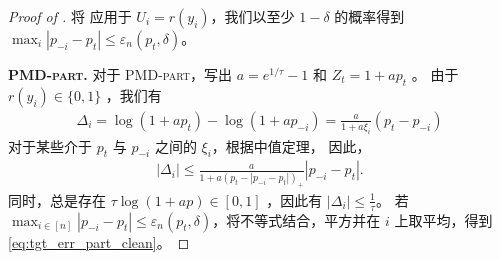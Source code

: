 \documentclass{article}
\theoremstyle{plain}
\theoremstyle{definition}
\theoremstyle{remark}
\newcommand{\abs}[1]{\left|#1\right|}
\begin{document}
\begin{proof}[Proof of ]
    将  应用于 $U_i=r(y_i)$，我们以至少 $1-\delta$ 的概率得到 $\max_i\abs{p_{-i}-p_t}\leq \varepsilon_n(p_t,\delta)$。

    \noindent\textbf{\textsc{PMD-part}.} 
    对于 \textsc{PMD-part}，写出 $a=e^{1/\tau}-1$  和 $Z_t=1+a p_t$ 。
    由于 $r(y_i)\in\{0,1\}$ ，我们有
    \begin{align*}
        \Delta_i
        =\log(1+a p_t)-\log(1+a p_{-i})
        =\frac{a}{1+a\xi_i}(p_t-p_{-i})
    \end{align*}
    对于某些介于 $p_t$ 与 $p_{-i}$ 之间的 $\xi_i$，根据中值定理，  
因此， 
    \begin{align*}
        \abs{\Delta_i}
        \leq\frac{a}{1+a(p_t-\abs{p_{-i}-p_t})_+}\abs{p_{-i}-p_t}.
    \end{align*}
    同时，总是存在 $\tau\log(1+ap)\in[0, 1]$ ，因此有 $\abs{\Delta_i}\leq\frac{1}{\tau}$。  
若 $\max_{i\in[n]}\abs{p_{-i}-p_t}\leq \varepsilon_n(p_t,\delta)$，将不等式结合，平方并在 $i$ 上取平均，得到 \eqref{eq:tgt_err_part_clean}。


\end{proof}
\end{document}

